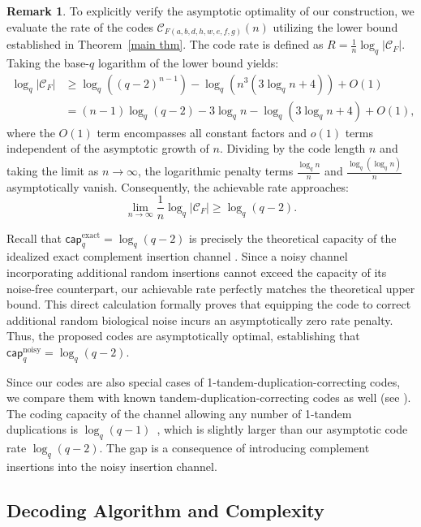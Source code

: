 \documentclass[pdflatex,sn-mathphys-num]{sn-jnl}
\theoremstyle{theorem}%
\theoremstyle{definition}
\newtheorem{remark}[theorem]{Remark}
\theoremstyle{construction}
\newtheorem{open problem}{Open problem}
\begin{document}
\begin{remark}
	To explicitly verify the asymptotic optimality of our construction, we evaluate the rate of the codes $\mathcal{C}_{F(a,b,d,h,w,e,f,g)}(n)$ utilizing the lower bound established in Theorem~\ref{main thm}. The code rate is defined as $R = \frac{1}{n}\log_q|\mathcal{C}_F|$. Taking the base-$q$ logarithm of the lower bound yields:
	\begin{align*}
		\log_q|\mathcal{C}_F| &\ge \log_q \left( (q-2)^{n-1} \right) - \log_q \left( n^3 (3\log_q n + 4) \right) + O(1) \\
		&= (n-1)\log_q(q-2) - 3\log_q n - \log_q(3\log_q n + 4) + O(1),
	\end{align*}
	where the $O(1)$ term encompasses all constant factors and $o(1)$ terms independent of the asymptotic growth of $n$. Dividing by the code length $n$ and taking the limit as $n \to \infty$, the logarithmic penalty terms $\frac{\log_q n}{n}$ and $\frac{\log_q(\log_q n)}{n}$ asymptotically vanish. Consequently, the achievable rate approaches:
	$$\lim_{n\to\infty} \frac{1}{n}\log_q|\mathcal{C}_F| \ge \log_q(q-2).$$
	
	Recall that $\mathsf{cap}^{\text{exact}}_{q} = \log_{q}(q-2)$ is precisely the theoretical capacity of the idealized exact complement insertion channel \cite{ys2}. Since a noisy channel incorporating additional random insertions cannot exceed the capacity of its noise-free counterpart, our achievable rate perfectly matches the theoretical upper bound. This direct calculation formally proves that equipping the code to correct additional random biological noise incurs an asymptotically zero rate penalty. Thus, the proposed codes are asymptotically optimal, establishing that $\mathsf{cap}^{\text{noisy}}_{q} = \log_q(q-2)$.
\end{remark}
Since our codes are also special cases of 1-tandem-duplication-correcting codes, we compare them with known tandem-duplication-correcting codes as well (see \cite{jf, fs, ze1, ze2, k, lw, gp, ys, ty, tf, tw,jf2,fs2, tw,tang noisy, tang isit}). The coding capacity of the channel allowing any number of 1-tandem duplications is $\log_{q}(q-1)$~\cite{jf,ys2}, which is slightly larger than our asymptotic code rate $\log_{q}(q-2)$. The gap is a consequence of introducing complement insertions into the noisy insertion channel.
\subsection{Decoding Algorithm and Complexity}
\label{sec:decoding}
\end{document}
